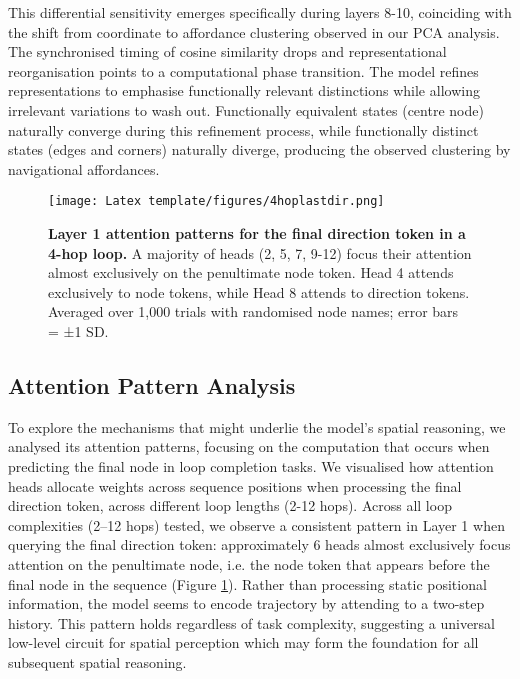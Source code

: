 This differential sensitivity emerges specifically during layers 8-10, coinciding with the shift from coordinate to affordance clustering observed in our PCA analysis. The synchronised timing of cosine similarity drops and representational reorganisation points to a computational phase transition. The model refines representations to emphasise functionally relevant distinctions while allowing irrelevant variations to wash out. Functionally equivalent states (centre node) naturally converge during this refinement process, while functionally distinct states (edges and corners) naturally diverge, producing the observed clustering by navigational affordances.

\begin{figure}[htbp]
\centering
\texttt{[image: Latex template/figures/4hoplastdir.png]}
\caption[Layer 1 attention patterns for the final direction token.]{\textbf{Layer 1 attention patterns for the final direction token in a 4-hop loop.} A majority of heads (2, 5, 7, 9-12) focus their attention almost exclusively on the penultimate node token. Head 4 attends exclusively to node tokens, while Head 8 attends to direction tokens. Averaged over 1,000 trials with randomised node names; error bars = ±1 SD.}
\label{fig:layer1_attention_patterns}
\end{figure}

\subsection{Attention Pattern Analysis}

To explore the mechanisms that might underlie the model’s spatial reasoning, we analysed its attention patterns, focusing on the computation that occurs when predicting the final node in loop completion tasks. We visualised how attention heads allocate weights across sequence positions when processing the final direction token, across different loop lengths (2-12 hops). Across all loop complexities (2--12 hops) tested, we observe a consistent pattern in Layer 1 when querying the final direction token: approximately 6 heads almost exclusively focus attention on the penultimate node, i.e. the node token that appears before the final node in the sequence (Figure \ref{fig:layer1_attention_patterns}). Rather than processing static positional information, the model seems to encode trajectory by attending to a two-step history. This pattern holds regardless of task complexity, suggesting a universal low-level circuit for spatial perception which may form the foundation for all subsequent spatial reasoning.  

